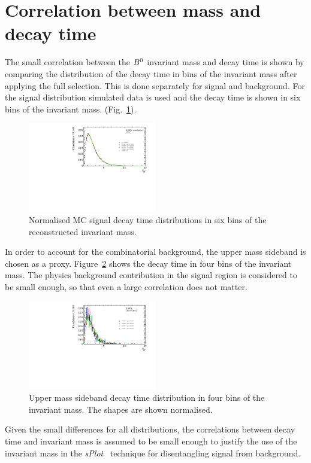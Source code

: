 \section[Correlation between $\Bz$ mass and decay time]{Correlation between \boldmath{$\Bz$} mass and decay time}
\label{app:invariantMassFit}

The small correlation between the $\Bz$ invariant mass and decay time is shown by comparing
the distribution of the decay time in bins of the invariant mass after applying the full
selection. This is done separately for signal and background. For the signal distribution
simulated data is used and the decay time is shown in six bins of the invariant mass.
(Fig.~\ref{fig:signalMassTime}).
\begin{figure}[b!]
  \begin{center}
   \includegraphics[width=0.5\textwidth]{AA-Appdx-massfit/figs/DecayTimeSignal.pdf}
  \end{center}
  \caption{Normalised MC signal decay time distributions in six bins of the reconstructed invariant mass.}
  \label{fig:signalMassTime}
\end{figure}
In order to account for the combinatorial background, the upper mass sideband is chosen as a
proxy. Figure~\ref{fig:bkgMassTime} shows the decay time in four bins of the invariant mass.
The physics background contribution in the signal region is considered to be small
enough, so that even a large correlation does not matter.
\begin{figure}[b!]
  \begin{center}
   \includegraphics[width=0.5\textwidth]{AA-Appdx-massfit/figs/DecayTimeBkg.pdf}
  \end{center}
  \caption{Upper mass sideband decay time distribution in four bins of the
  invariant mass. The shapes are shown normalised.}
  \label{fig:bkgMassTime}
\end{figure}
Given the small differences for all distributions, the correlations between decay time and
invariant mass is assumed to be small enough to justify the use of the invariant mass in the \emph{sPlot}~\cite{sPlot} technique
for disentangling signal from background.
